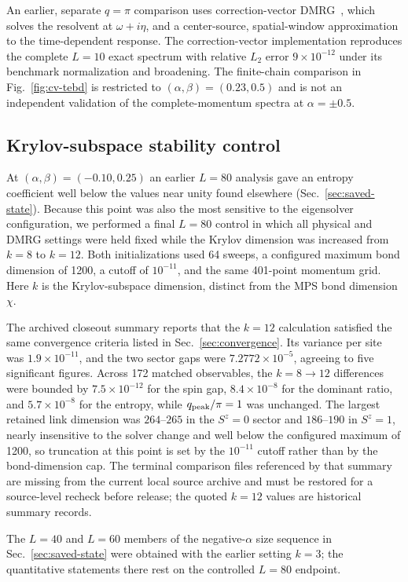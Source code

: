 An earlier, separate $q=\pi$ comparison uses correction-vector
DMRG~\cite{kuehner1999,jeckelmann2002,nocera2016,nocera2018rixs}, which solves
the resolvent at $\omega+i\eta$, and a center-source, spatial-window
approximation to the time-dependent response.
The correction-vector implementation reproduces the complete $L=10$ exact
spectrum with relative $L_2$ error $9\times10^{-12}$ under its benchmark
normalization and broadening.
The finite-chain comparison in Fig.~\ref{fig:cv-tebd} is restricted to
$(\alpha,\beta)=(0.23,0.5)$ and is not an independent validation of the
complete-momentum spectra at $\alpha=\pm0.5$.

\subsection{Krylov-subspace stability control}
\label{sec:krylov}

At $(\alpha,\beta)=(-0.10,0.25)$ an earlier $L=80$ analysis gave an entropy
coefficient well below the values near unity found elsewhere
(Sec.~\ref{sec:saved-state}).
Because this point was also the most sensitive to the eigensolver configuration,
we performed a final $L=80$ control in which all physical and DMRG settings were held fixed while the
Krylov dimension was increased from $k=8$ to $k=12$.
Both initializations used 64 sweeps, a configured maximum bond dimension of 1200,
a cutoff of $10^{-11}$, and the same 401-point momentum grid.
Here $k$ is the Krylov-subspace dimension, distinct from the MPS bond dimension
$\chi$.

The archived closeout summary reports that the $k=12$ calculation satisfied
the same convergence criteria listed in Sec.~\ref{sec:convergence}.
Its variance per site was $1.9\times10^{-11}$, and the two sector gaps were
$7.2772\times10^{-5}$, agreeing to five significant figures.
Across 172 matched observables, the $k=8\rightarrow12$ differences were bounded by
$7.5\times10^{-12}$ for the spin gap, $8.4\times10^{-8}$ for the dominant
ratio, and $5.7\times10^{-8}$ for the entropy, while $q_{\mathrm{peak}}/\pi=1$ was
unchanged.
The largest retained link dimension was $264$--$265$ in the $S^z=0$ sector and
$186$--$190$ in $S^z=1$, nearly insensitive to the solver change and well below
the configured maximum of 1200, so truncation at this point is set by the
$10^{-11}$ cutoff rather than by the bond-dimension cap.
The terminal comparison files referenced by that summary are missing from the
current local source archive and must be restored for a source-level recheck
before release; the quoted $k=12$ values are historical summary records.

The $L=40$ and $L=60$ members of the negative-$\alpha$ size sequence in
Sec.~\ref{sec:saved-state} were obtained with the earlier setting $k=3$; the
quantitative statements there rest on the controlled $L=80$ endpoint.
